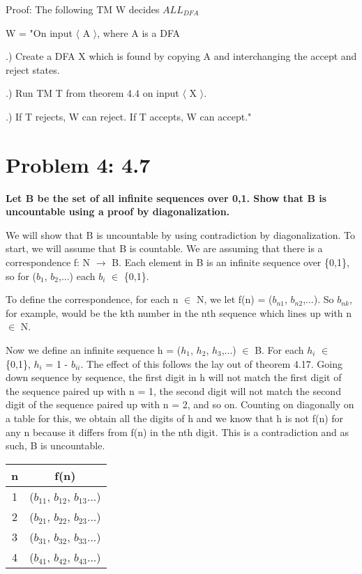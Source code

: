 \documentclass[12pt]{article}
\begin{document}
Proof: The following TM W decides $ALL_{DFA}$

W = "On input $\langle$ A $\rangle$, where A is a DFA
\setlength{\parindent}{5ex}

.) Create a DFA X which is found by copying A and interchanging the accept and \indent reject states.

.) Run TM T from theorem 4.4 on input $\langle$ X $\rangle$.

.) If T rejects, W can reject. If T accepts, W can accept."
\setlength{\parindent}{0ex}

\section*{Problem 4: 4.7}
{\bfseries Let B be the set of all infinite sequences over {0,1}. Show that B is uncountable using a proof by diagonalization.}

We will show that B is uncountable by using contradiction by diagonalization. To start, we will assume that B is countable. We are assuming that there is a correspondence f: N $\xrightarrow{}$ B. Each element in B is an infinite sequence over \{0,1\}, so for ($b_1$, $b_2$,...) each $b_i$ $\in$ \{0,1\}.  

To define the correspondence, for each n $\in$ N, we let f(n) = ($b_{n1}$, $b_{n2}$,...). So $b_{nk}$, for example, would be the kth number in the nth sequence which lines up with n $\in$ N. 

Now we define an infinite sequence h = ($h_{1}$, $h_{2}$, $h_{3}$,...) $\in$ B. For each $h_{i}$ $\in$ \{0,1\}, $h_{i}$ = 1 - $b_{ii}$. The effect of this follows the lay out of theorem 4.17. Going down sequence by sequence, the first digit in h will not match the first digit of the sequence paired up with n = 1, the second digit will not match the second digit of the sequence paired up with n = 2, and so on. Counting on diagonally on a table for this, we obtain all the digits of h and we know that h is not f(n) for any n because it differs from f(n) in the nth digit. This is a contradiction and as such, B is uncountable.

\begin{center}
\begin{tabular}{ |c|c| } 
 \hline
 n & f(n)\\ 
 \hline
 1 & ($b_{11}$, $b_{12}$, $b_{13}$...)\\ 
 \hline
 2 & ($b_{21}$, $b_{22}$, $b_{23}$...)\\ 
 \hline
 3 & ($b_{31}$, $b_{32}$, $b_{33}$...)\\ 
 \hline
 4 & ($b_{41}$, $b_{42}$, $b_{43}$...)\\ 
 \hline
\end{tabular}
\end{center}
\end{document}
